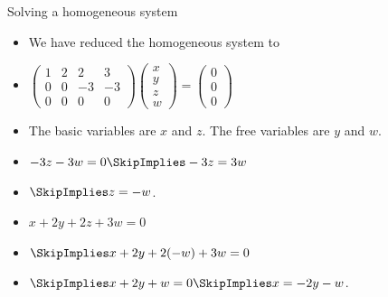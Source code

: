 \documentclass{beamer}
\begin{document}
\begin{frame}{Solving a homogeneous system}

\begin{itemize}
\item We have reduced the homogeneous system to
\item
$
\begin{pmatrix}
1 & 2 & 2 & 3 \\
0 & 0 & -3 & -3 \\
0 & 0 & 0 & 0
\end{pmatrix}
\begin{pmatrix}
x \\ y \\ z \\ w
\end{pmatrix}
=
\begin{pmatrix}
0 \\ 0 \\  0
\end{pmatrix}
$
\item The basic variables are $x$ and $z$. The free variables are $y$ and $w$.
\item $-3z -3w = 0 \SkipImplies -3z = 3w $
\item $ \SkipImplies z = - w$.
\item $x + 2y +2z +3w = 0 $
\item $\SkipImplies x +2y + 2(-w) + 3w = 0$
\item $\SkipImplies x + 2y  + w = 0 \SkipImplies x = -2y - w$.
\end{itemize}
\end{frame}
\end{document}
